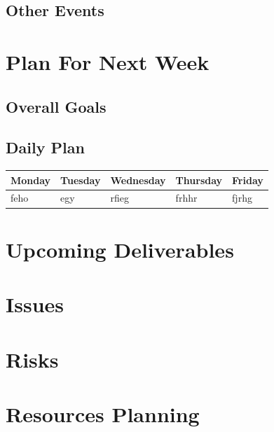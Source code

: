 \documentclass[12pt,notitlepage]{article}
\begin{document}
\subsection{Other Events}

\section{Plan For Next Week}
\subsection{Overall Goals}

\subsection{Daily Plan}
\begin{tabularx}{\textwidth}{X|X|X|X|X}
\textbf{Monday} & \textbf{Tuesday} & \textbf{Wednesday} & \textbf{Thursday} & \textbf{Friday} \\ \hline
feho & egy & rfieg & frhhr & fjrhg \\ 
\end{tabularx}

\section{Upcoming Deliverables}

\section{Issues}

\section{Risks}

\section{Resources Planning}
\end{document}
